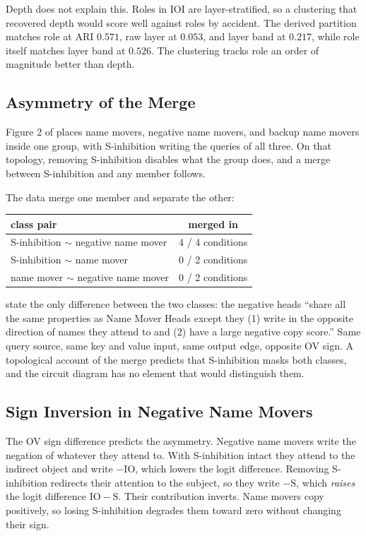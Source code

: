 \documentclass{article}
\begin{document}
Depth does not explain this. Roles in IOI are layer-stratified, so a clustering that
recovered depth would score well against roles by accident. The derived partition matches
role at ARI $0.571$, raw layer at $0.053$, and layer band at $0.217$, while role itself
matches layer band at $0.526$. The clustering tracks role an order of magnitude better than
depth.

\subsection{Asymmetry of the Merge}

Figure 2 of \citet{wang2022ioi} places name movers, negative name movers, and backup name
movers inside one group, with S-inhibition writing the queries of all three. On that
topology, removing S-inhibition disables what the group does, and a merge between
S-inhibition and any member follows.

The data merge one member and separate the other:

\begin{center}
\begin{tabular}{lc}
\toprule
class pair & merged in \\
\midrule
S-inhibition $\sim$ negative name mover & 4 / 4 conditions \\
S-inhibition $\sim$ name mover & 0 / 2 conditions \\
name mover $\sim$ negative name mover & 0 / 2 conditions \\
\bottomrule
\end{tabular}
\end{center}

\citet{wang2022ioi} state the only difference between the two classes: the negative heads
``share all the same properties as Name Mover Heads except they (1) write in the opposite
direction of names they attend to and (2) have a large negative copy score.'' Same query
source, same key and value input, same output edge, opposite OV sign. A topological account
of the merge predicts that S-inhibition masks both classes, and the circuit diagram has no
element that would distinguish them.

\subsection{Sign Inversion in Negative Name Movers}

The OV sign difference predicts the asymmetry. Negative name movers write the negation of
whatever they attend to. With S-inhibition intact they attend to the indirect object and
write $-\mathrm{IO}$, which lowers the logit difference. Removing S-inhibition redirects
their attention to the subject, so they write $-\mathrm{S}$, which \emph{raises} the logit
difference $\mathrm{IO} - \mathrm{S}$. Their contribution inverts. Name movers copy
positively, so losing S-inhibition degrades them toward zero without changing their sign.
\end{document}

